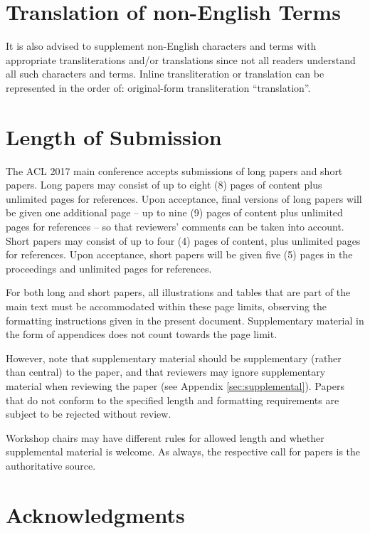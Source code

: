 \documentclass[11pt,a4paper]{article}
\begin{document}
\section{Translation of non-English Terms}

It is also advised to supplement non-English characters and terms
with appropriate transliterations and/or translations
since not all readers understand all such characters and terms.
Inline transliteration or translation can be represented in
the order of: original-form transliteration ``translation''.

\section{Length of Submission}
\label{sec:length}

The ACL 2017 main conference accepts submissions of long papers and
short papers.
 Long papers may consist of up to eight (8) pages of
content plus unlimited pages for references. Upon acceptance, final
versions of long papers will be given one additional page -- up to nine (9)
pages of content plus unlimited pages for references -- so that reviewers' comments
can be taken into account. Short papers may consist of up to four (4)
pages of content, plus unlimited pages for references. Upon
acceptance, short papers will be given five (5) pages in the
proceedings and unlimited pages for references. 

For both long and short papers, all illustrations and tables that are part
of the main text must be accommodated within these page limits, observing
the formatting instructions given in the present document. Supplementary
material in the form of appendices does not count towards the page limit.

However, note that supplementary material should be supplementary
(rather than central) to the paper, and that reviewers may ignore
supplementary material when reviewing the paper (see Appendix
\ref{sec:supplemental}). Papers that do not conform to the specified
length and formatting requirements are subject to be rejected without
review.

Workshop chairs may have different rules for allowed length and
whether supplemental material is welcome. As always, the respective
call for papers is the authoritative source.

\section*{Acknowledgments}
\end{document}
